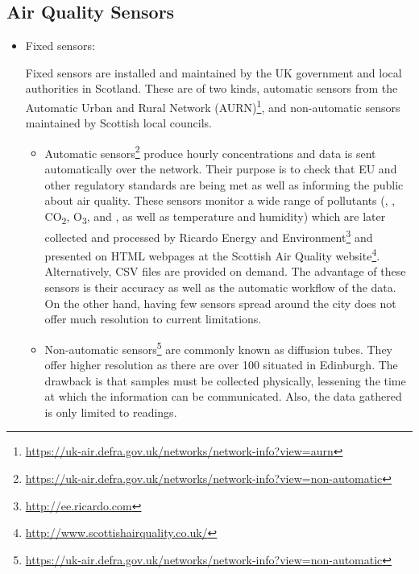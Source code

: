 \subsection{Air Quality Sensors}

\begin{itemize}

\item Fixed sensors: 

Fixed sensors are installed and maintained by the UK government and local authorities in Scotland. These are of two kinds, automatic sensors from the Automatic Urban and Rural Network (AURN)\footnote{\url{https://uk-air.defra.gov.uk/networks/network-info?view=aurn}}, and non-automatic sensors maintained by Scottish local councils.

	\begin{itemize}
    
    \item Automatic sensors\footnote{\url{https://uk-air.defra.gov.uk/networks/network-info?view=non-automatic}} produce hourly concentrations and data is sent automatically over the network. Their purpose is to check that EU and other regulatory standards are being met as well as informing the public about air quality. These sensors monitor a wide range of pollutants (\NOX, \SOTWO, CO\textsubscript{2}, O\textsubscript{3}, \PMTWO and \PMTEN, as well as temperature and humidity) which are later collected and processed by Ricardo Energy and Environment\footnote{\url{http://ee.ricardo.com}} and presented on HTML webpages at the Scottish Air Quality website\footnote{\url{http://www.scottishairquality.co.uk/}}. Alternatively, CSV files are provided on demand. The advantage of these sensors is their accuracy as well as the automatic workflow of the data. On the other hand, having few sensors spread around the city does not offer much resolution to current limitations. 
    \item Non-automatic sensors\footnote{\url{https://uk-air.defra.gov.uk/networks/network-info?view=non-automatic}} are commonly known as diffusion tubes. They offer higher resolution as there are over 100 situated in Edinburgh. The drawback is that samples must be collected physically, lessening the time at which the information can be communicated. Also, the data gathered is only limited to \NOTWO readings.
    \end{itemize}


\end{itemize}

